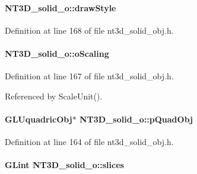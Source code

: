 \paragraph[{drawStyle}]{ {\bf NT3D\_\-solid\_\-o::drawStyle}}\hfill\label{class_n_t3_d__solid__o_afcc89c47ace5e27bc9915dbe8fe78151}


Definition at line 168 of file nt3d\_\-solid\_\-obj.h.

\paragraph[{oScaling}]{ {\bf NT3D\_\-solid\_\-o::oScaling}}\hfill\label{class_n_t3_d__solid__o_a4ea9ed495b7699150d7cdea2c637694e}


Definition at line 167 of file nt3d\_\-solid\_\-obj.h.



Referenced by ScaleUnit().

\paragraph[{pQuadObj}]{\setlength{\rightskip}{0pt plus 5cm}GLUquadricObj$\ast$ {\bf NT3D\_\-solid\_\-o::pQuadObj}}\hfill\label{class_n_t3_d__solid__o_ae163e13c24275d33bafb41ee4529b601}


Definition at line 164 of file nt3d\_\-solid\_\-obj.h.

\paragraph[{slices}]{\setlength{\rightskip}{0pt plus 5cm}GLint {\bf NT3D\_\-solid\_\-o::slices}}\hfill\label{class_n_t3_d__solid__o_a7134b273f8665db6fd83ab2863d8224d}


